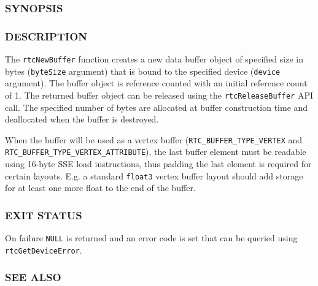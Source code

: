 \subsubsection{SYNOPSIS}\label{synopsis}

\begin{Shaded}
\begin{Highlighting}[]

\OperatorTok{(}
\OperatorTok{,}
\OperatorTok{);}
\end{Highlighting}
\end{Shaded}

\subsubsection{DESCRIPTION}\label{description}

The \texttt{rtcNewBuffer} function creates a new data buffer object of
specified size in bytes (\texttt{byteSize} argument) that is bound to
the specified device (\texttt{device} argument). The buffer object is
reference counted with an initial reference count of 1. The returned
buffer object can be released using the \texttt{rtcReleaseBuffer} API
call. The specified number of bytes are allocated at buffer construction
time and deallocated when the buffer is destroyed.

When the buffer will be used as a vertex buffer
(\texttt{RTC\_BUFFER\_TYPE\_VERTEX} and
\texttt{RTC\_BUFFER\_TYPE\_VERTEX\_ATTRIBUTE}), the last buffer element
must be readable using 16-byte SSE load instructions, thus padding the
last element is required for certain layouts. E.g. a standard
\texttt{float3} vertex buffer layout should add storage for at least one
more float to the end of the buffer.

\subsubsection{EXIT STATUS}\label{exit-status}

On failure \texttt{NULL} is returned and an error code is set that can
be queried using \texttt{rtcGetDeviceError}.

\subsubsection{SEE ALSO}\label{see-also}


